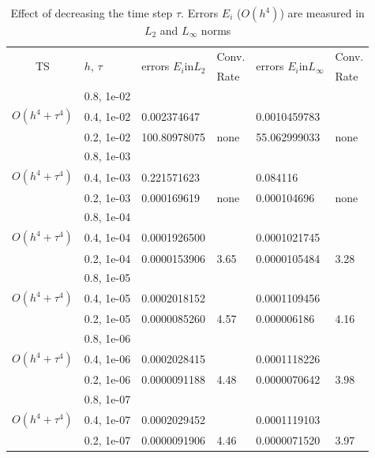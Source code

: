 \documentclass[%
 aip,
cp,  
 amsmath,amssymb,
 reprint,
]{iopconfser}
\begin{document}
\begin{table}[ht]
\centering
\small
		\begin{tabular}{||c|l|ll|ll||}
			\hline
			\hline
      \multirow{2  }{*}{TS}        & \multirow{2  }{*}{$h$, $\tau$}  & \multirow{2  }{*}{errors $E_i$in$L_2$}  &Conv.& \multirow{2  }{*}{errors $E_i$in$L_\infty$}  &Conv.  \\
	         &                    &                               & Rate   &                                        & Rate \\
   			\hline 
					\hline 
                    &0.8, 1e-02          &              &              &                     &      \\
 $O(h^4 + \tau^ 4)$  &0.4, 1e-02          &0.002374647 &            &0.0010459783     &       \\
                     &0.2, 1e-02  & 100.80978075  & none    &55.062999033 &      none      \\
			\hline 
                    &0.8, 1e-03          &              &              &                     &      \\
$O(h^4 + \tau^ 4)$    &0.4, 1e-03          &0.221571623 &            & 0.084116     &       \\
                    &0.2, 1e-03  & 0.000169619  & none   &0.000104696 &     none      \\
			\hline
                    &0.8, 1e-04          &              &              &                     &      \\
     $O(h^4 + \tau^ 4)$  &0.4, 1e-04          &0.0001926500 &            & 0.0001021745    &       \\
                    &0.2, 1e-04  & 0.0000153906  & 3.65   &0.0000105484 &     3.28      \\
    \hline
                    &0.8, 1e-05          &              &              &                     &      \\
     $O(h^4 + \tau^ 4)$   &0.4, 1e-05          &0.0002018152 &            & 0.0001109456    &       \\
                    &0.2, 1e-05  & 0.0000085260 & 4.57   &0.000006186 &      4.16      \\
    \hline
                    &0.8, 1e-06          &              &              &                     &      \\
     $O(h^4 + \tau^ 4)$ &0.4, 1e-06          &0.0002028415 &            & 0.0001118226    &       \\
                    &0.2, 1e-06  & 0.0000091188 & 4.48  &0.0000070642 &      3.98    \\
    \hline
                    &0.8, 1e-07          &              &              &                     &      \\
       $O(h^4 + \tau^ 4)$                  &0.4, 1e-07          &0.0002029452 &            & 0.0001119103    &       \\
   &0.2, 1e-07  & 0.0000091906 & 4.46  &0.0000071520 &       3.97    \\
    \hline
			\hline 
		\end{tabular}
		\caption{Effect of decreasing the time step $\tau$. Errors $E_i$ ($O(h^{4})$) are measured in $L_2$ and $L_\infty$ norms}
\label{tableConvSeq}
\end{table}
\end{document}
